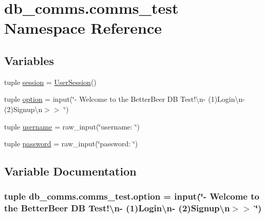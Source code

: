 \hypertarget{namespacedb__comms_1_1comms__test}{}\section{db\+\_\+comms.\+comms\+\_\+test Namespace Reference}
\label{namespacedb__comms_1_1comms__test}
\subsection*{Variables}
\begin{DoxyCompactItemize}
\item 
tuple \hyperlink{namespacedb__comms_1_1comms__test_a164aac5cbf032410febfe516997942ca}{session} = \hyperlink{classdb__comms_1_1comms_1_1_user_session}{User\+Session}()
\item 
tuple \hyperlink{namespacedb__comms_1_1comms__test_acc223bf9edf92bfa95bbaafdad88f083}{option} = input(\char`\"{}-\/ Welcome to the Better\+Beer D\+B Test!\textbackslash{}n-\/ (1)Login\textbackslash{}n-\/ (2)Signup\textbackslash{}n$>$$>$ \char`\"{})
\item 
tuple \hyperlink{namespacedb__comms_1_1comms__test_a0a387f4eb9b75c0f3fff8e8dcf0c11e6}{username} = raw\+\_\+input(\char`\"{}username\+: \char`\"{})
\item 
tuple \hyperlink{namespacedb__comms_1_1comms__test_a4e858fd6a002a5016e2d93032fdab765}{password} = raw\+\_\+input(\char`\"{}password\+: \char`\"{})
\end{DoxyCompactItemize}


\subsection{Variable Documentation}
\hypertarget{namespacedb__comms_1_1comms__test_acc223bf9edf92bfa95bbaafdad88f083}{}
\subsubsection[{option}]{\setlength{\rightskip}{0pt plus 5cm}tuple db\+\_\+comms.\+comms\+\_\+test.\+option = input(\char`\"{}-\/ Welcome to the Better\+Beer D\+B Test!\textbackslash{}n-\/ (1)Login\textbackslash{}n-\/ (2)Signup\textbackslash{}n$>$$>$ \char`\"{})}\label{namespacedb__comms_1_1comms__test_acc223bf9edf92bfa95bbaafdad88f083}
\hypertarget{namespacedb__comms_1_1comms__test_a4e858fd6a002a5016e2d93032fdab765}{}
